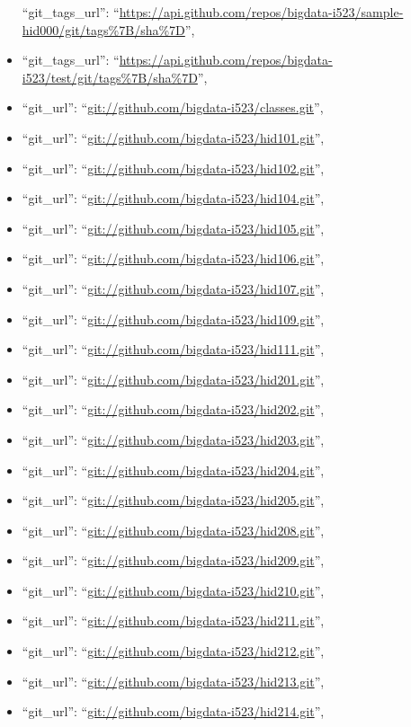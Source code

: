 \begin{itemize}
  ``git\_tags\_url'':
  ``\url{https://api.github.com/repos/bigdata-i523/sample-hid000/git/tags\%7B/sha\%7D}'',
\item
  ``git\_tags\_url'':
  ``\url{https://api.github.com/repos/bigdata-i523/test/git/tags\%7B/sha\%7D}'',
\item
  ``git\_url'': ``\url{git://github.com/bigdata-i523/classes.git}'',
\item
  ``git\_url'': ``\url{git://github.com/bigdata-i523/hid101.git}'',
\item
  ``git\_url'': ``\url{git://github.com/bigdata-i523/hid102.git}'',
\item
  ``git\_url'': ``\url{git://github.com/bigdata-i523/hid104.git}'',
\item
  ``git\_url'': ``\url{git://github.com/bigdata-i523/hid105.git}'',
\item
  ``git\_url'': ``\url{git://github.com/bigdata-i523/hid106.git}'',
\item
  ``git\_url'': ``\url{git://github.com/bigdata-i523/hid107.git}'',
\item
  ``git\_url'': ``\url{git://github.com/bigdata-i523/hid109.git}'',
\item
  ``git\_url'': ``\url{git://github.com/bigdata-i523/hid111.git}'',
\item
  ``git\_url'': ``\url{git://github.com/bigdata-i523/hid201.git}'',
\item
  ``git\_url'': ``\url{git://github.com/bigdata-i523/hid202.git}'',
\item
  ``git\_url'': ``\url{git://github.com/bigdata-i523/hid203.git}'',
\item
  ``git\_url'': ``\url{git://github.com/bigdata-i523/hid204.git}'',
\item
  ``git\_url'': ``\url{git://github.com/bigdata-i523/hid205.git}'',
\item
  ``git\_url'': ``\url{git://github.com/bigdata-i523/hid208.git}'',
\item
  ``git\_url'': ``\url{git://github.com/bigdata-i523/hid209.git}'',
\item
  ``git\_url'': ``\url{git://github.com/bigdata-i523/hid210.git}'',
\item
  ``git\_url'': ``\url{git://github.com/bigdata-i523/hid211.git}'',
\item
  ``git\_url'': ``\url{git://github.com/bigdata-i523/hid212.git}'',
\item
  ``git\_url'': ``\url{git://github.com/bigdata-i523/hid213.git}'',
\item
  ``git\_url'': ``\url{git://github.com/bigdata-i523/hid214.git}'',

\end{itemize}
